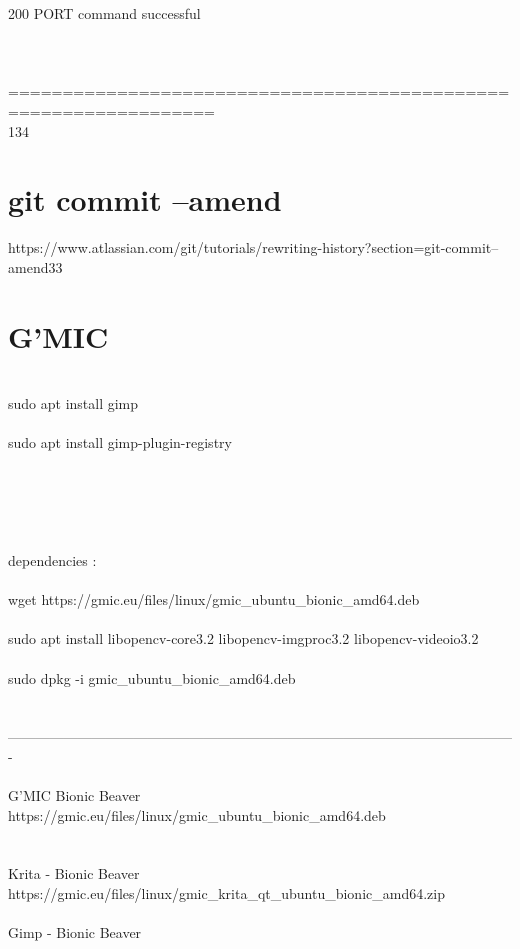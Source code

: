 \documentclass[10pt,a4paper]{article}
\begin{document}
{{{{{{{{{{{{{{{200 PORT command successful\\
\\
\\
\\
=================================================================\\
134
\hypertarget{git_commit_--amend}{\section {git commit --amend}}
https://www.atlassian.com/git/tutorials/rewriting-history?section=git-commit--amend33
\hypertarget{g'mic}{\section {G'MIC}}
\textbf{{\Large }}{\large \\
sudo apt install gimp\\
\\
sudo apt install gimp-plugin-registry\\
\\
\\
\\
\\
\\
dependencies :\\
\\
wget https://gmic.eu/files/linux/gmic\_ubuntu\_bionic\_amd64.deb}{\large \\
\\
sudo apt install libopencv-core3.2 libopencv-imgproc3.2 libopencv-videoio3.2 \\
\\
sudo dpkg -i gmic\_ubuntu\_bionic\_amd64.deb\\
\\
\\
-------------------------------------------------------------------------------------------------------------\\
\\
G'MIC    Bionic Beaver  \\
https://gmic.eu/files/linux/gmic\_ubuntu\_bionic\_amd64.deb}{\large \\
\\
\\
Krita - Bionic Beaver\\
https://gmic.eu/files/linux/gmic\_krita\_qt\_ubuntu\_bionic\_amd64.zip}{\large \\
\\
Gimp - Bionic Beaver\\
}}}}}}}}}}}}}}}}
\end{document}
